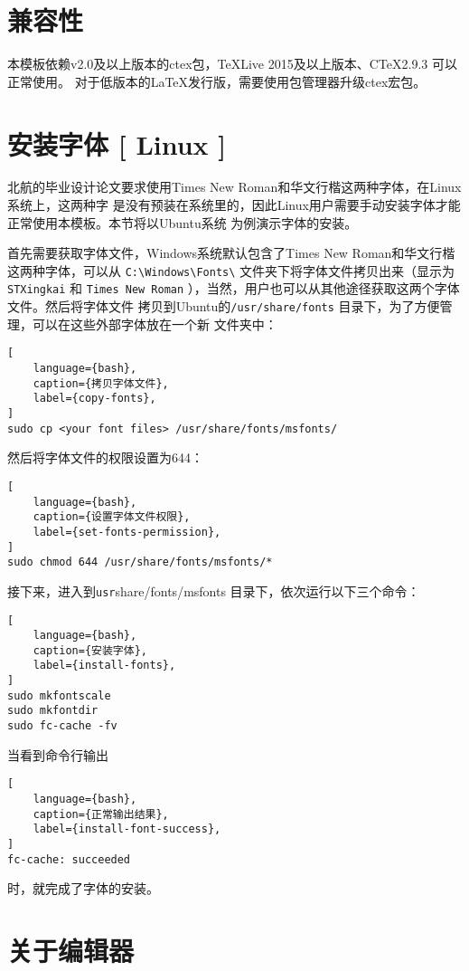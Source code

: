 \section{兼容性}

本模板依赖v2.0及以上版本的ctex包，\TeX{}Live 2015及以上版本、C\TeX{}2.9.3 可以正常使用。
对于低版本的\LaTeX{}发行版，需要使用包管理器升级ctex宏包。

\section{安装字体 [ Linux ]}

北航的毕业设计论文要求使用Times New Roman和华文行楷这两种字体，在Linux系统上，这两种字
是没有预装在系统里的，因此Linux用户需要手动安装字体才能正常使用本模板。本节将以Ubuntu系统
为例演示字体的安装。

首先需要获取字体文件，Windows系统默认包含了Times New Roman和华文行楷这两种字体，可以从
{\verb !C:\Windows\Fonts\! }文件夹下将字体文件拷贝出来（显示为{\verb !STXingkai! }和
{\verb !Times New Roman! }），当然，用户也可以从其他途径获取这两个字体文件。然后将字体文件
拷贝到Ubuntu的{\verb !/usr/share/fonts! }目录下，为了方便管理，可以在这些外部字体放在一个新
文件夹中：
\begin{lstlisting}[
    language={bash},
    caption={拷贝字体文件},
    label={copy-fonts},
]
sudo cp <your font files> /usr/share/fonts/msfonts/
\end{lstlisting}
然后将字体文件的权限设置为644：
\begin{lstlisting}[
    language={bash},
    caption={设置字体文件权限},
    label={set-fonts-permission},
]
sudo chmod 644 /usr/share/fonts/msfonts/*
\end{lstlisting}
接下来，进入到{\verb /usr/share/fonts/msfonts } 目录下，依次运行以下三个命令：
\begin{lstlisting}[
    language={bash},
    caption={安装字体},
    label={install-fonts},
]
sudo mkfontscale
sudo mkfontdir
sudo fc-cache -fv
\end{lstlisting}
当看到命令行输出
\begin{lstlisting}[
    language={bash},
    caption={正常输出结果},
    label={install-font-success},
]
fc-cache: succeeded
\end{lstlisting}
时，就完成了字体的安装。

\section{关于编辑器}

